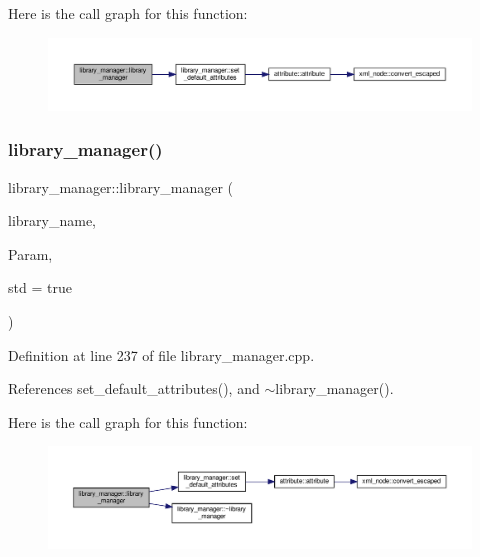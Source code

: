 Here is the call graph for this function\+:
\nopagebreak
\begin{figure}[H]
\begin{center}
\leavevmode
\includegraphics[width=350pt]{d8/d35/classlibrary__manager_af71a5b63e8589cc3e9d81e2748f571b5_cgraph}
\end{center}
\end{figure}
\mbox{\label{classlibrary__manager_adf29fa335541787d0fea1a8b0db9dcc6}} 
\subsubsection{\texorpdfstring{library\+\_\+manager()}{library\_manager()}\hspace{0.1cm}{\footnotesize\ttfamily [2/2]}}
{\footnotesize\ttfamily library\+\_\+manager\+::library\+\_\+manager (\begin{DoxyParamCaption}\item[{std\+::string}]{library\+\_\+name,  }\item[{\hyperlink{Parameter_8hpp_a37841774a6fcb479b597fdf8955eb4ea}{Parameter\+Const\+Ref}}]{Param,  }\item[{bool}]{std = {\ttfamily true} }\end{DoxyParamCaption})}



Definition at line 237 of file library\+\_\+manager.\+cpp.



References set\+\_\+default\+\_\+attributes(), and $\sim$library\+\_\+manager().

Here is the call graph for this function\+:
\nopagebreak
\begin{figure}[H]
\begin{center}
\leavevmode
\includegraphics[width=350pt]{d8/d35/classlibrary__manager_adf29fa335541787d0fea1a8b0db9dcc6_cgraph}
\end{center}
\end{figure}
\mbox{\label{classlibrary__manager_a51dd14df3ed399e17d62fddfacf54557}} 

